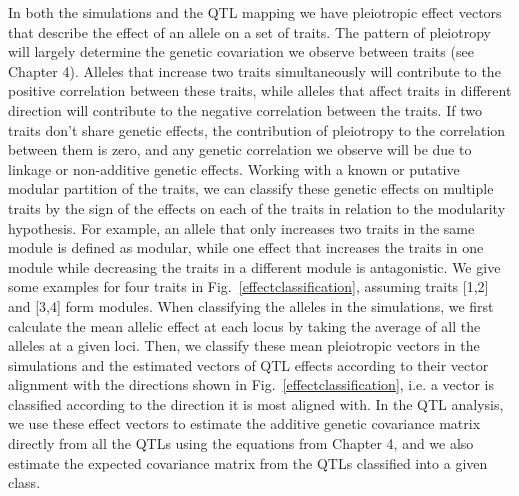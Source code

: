 \begin{refsection}
In both the simulations and the QTL mapping we have pleiotropic effect vectors
that describe the effect of an allele on a set of traits. The pattern of
pleiotropy will largely determine the genetic covariation we observe between
traits (see Chapter 4). Alleles that increase two traits simultaneously will
contribute to the positive correlation between these traits, while alleles
that affect traits in different direction will contribute to the negative
correlation between the traits. If two traits don't share genetic effects, the
contribution of pleiotropy to the correlation between them is zero, and any
genetic correlation we observe will be due to linkage or non-additive genetic
effects. Working with a known or putative modular partition of the traits, we
can classify these genetic effects on multiple traits by the sign of the
effects on each of the traits in relation to the modularity hypothesis. For
example, an allele that only increases two traits in the same module is
defined as modular, while one effect that increases the traits in one module
while decreasing the traits in a different module is antagonistic.  We give
some examples for four traits in Fig.~\ref{effectclassification}, assuming
traits [1,2] and [3,4] form modules. When classifying the alleles in the
simulations, we first calculate the mean allelic effect at each locus by taking
the average of all the alleles at a given loci. Then, we classify these mean
pleiotropic vectors in the simulations and the estimated vectors of QTL
effects according to their vector alignment with the directions shown in
Fig.~\ref{effectclassification}, i.e. a vector is classified according to the
direction it is most aligned with. In the QTL analysis,  we use these effect
vectors to estimate the additive genetic  covariance matrix directly from all
the QTLs using the equations from Chapter 4, and we also estimate the expected
covariance matrix from the QTLs classified into a given class.



\end{refsection}
